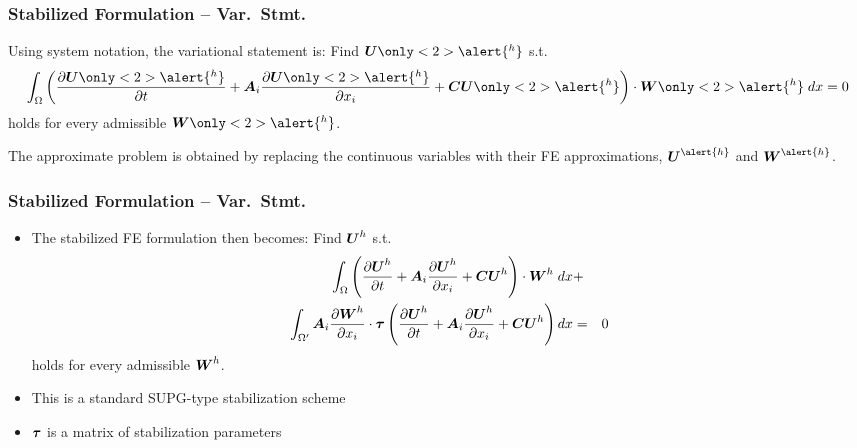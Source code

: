 \begin{frame}[t]
  \frametitle{Stabilized Formulation -- Var.\ Stmt.}
  \begin{itemize}
    \item{Using system notation, the variational statement is:
      Find $\bv{U}\only<2>{\alert{^h}}$ s.t.
      \begin{equation}
	\nonumber
	\int_{\Omega} \left( \frac{\partial \bv{U}\only<2>{\alert{^h}}}{\partial t}
	+ \bv{A}_i\frac{\partial \bv{U}\only<2>{\alert{^h}}}{\partial x_i}
	+ \bv{C} \bv{U}\only<2>{\alert{^h}} \right) \cdot \bv{W}\only<2>{\alert{^h}} \;dx
	= 0
      \end{equation}
      holds for every admissible $\bv{W}\only<2>{\alert{^h}}$.
    }
	  {
	    \item{
	    The approximate problem is obtained by replacing the continuous
	    variables with their FE approximations,
	    $\bv{U}^{\alert{h}}$ and $\bv{W}^{\alert{h}}$.}
	  }
  \end{itemize}
\end{frame}

\begin{frame}[t]
  \frametitle{Stabilized Formulation -- Var.\ Stmt.}
  \begin{itemize}[<+->]
    \item{The stabilized FE formulation then becomes:
      Find ${\boldsymbol{U}}^h$ s.t.
      \begin{eqnarray}
  \nonumber
  \int_{\Omega} \left( \frac{\partial {\boldsymbol{U}}^h}{\partial t}
  + {\boldsymbol{A}}_i\frac{\partial {\boldsymbol{U}}^h}{\partial x_i}
  + {\boldsymbol{C}} {\boldsymbol{U}}^h \right) \cdot {\boldsymbol{W}}^h \;dx &+&
  \\
  \nonumber
  \int_{\Omega'} {\boldsymbol{A}}_i\frac{\partial {\boldsymbol{W}}^h}{\partial x_i}
  \cdot {\boldsymbol{\tau}} \left( \frac{\partial {\boldsymbol{U}}^h}{\partial t}
  + {\boldsymbol{A}}_i\frac{\partial {\boldsymbol{U}}^h}{\partial x_i}
  + {\boldsymbol{C}} {\boldsymbol{U}}^h \right)dx 
  &=& 0
\end{eqnarray}
      holds for every admissible ${\boldsymbol{W}}^h$.
    }
    \item{This is a standard SUPG-type stabilization scheme}
    \item{${\boldsymbol{\tau}}$ is a matrix of stabilization parameters}
  \end{itemize}
\end{frame}

